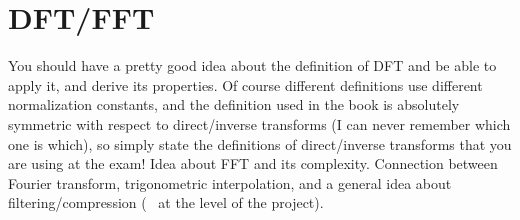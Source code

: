 \section{DFT/FFT}

You should have a pretty good idea about the definition of DFT and be able to apply it, and derive its properties. Of course different definitions use different normalization constants, and the definition used in the book is absolutely symmetric with respect to direct/inverse transforms (I can never remember which one is which), so simply state the definitions of direct/inverse transforms that you are using at the exam! Idea about FFT and its complexity. Connection between Fourier transform, trigonometric interpolation, and a general idea about filtering/compression (~ at the level of the project).